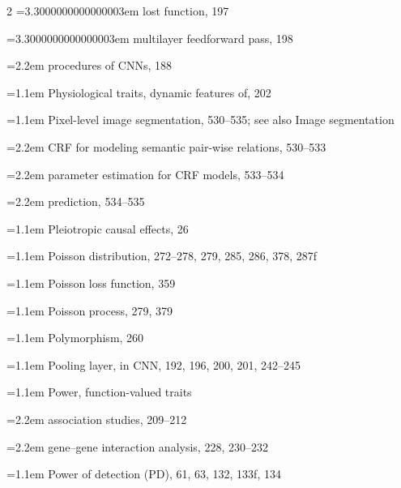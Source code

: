 \begin{multicols}{2}
\noindent\hangindent=3.3000000000000003em \hspace*{2.2em}lost function, 197\par
\noindent\hangindent=3.3000000000000003em \hspace*{2.2em}multilayer feedforward pass, 198\par
\noindent\hangindent=2.2em \hspace*{1.1em}procedures of CNNs, 188\par
\noindent\hangindent=1.1em Physiological traits, dynamic features of, 202\par
\noindent\hangindent=1.1em Pixel-level image segmentation, 530--535; see also Image segmentation\par
\noindent\hangindent=2.2em \hspace*{1.1em}CRF for modeling semantic pair-wise relations, 530--533\par
\noindent\hangindent=2.2em \hspace*{1.1em}parameter estimation for CRF models, 533--534\par
\noindent\hangindent=2.2em \hspace*{1.1em}prediction, 534--535\par
\noindent\hangindent=1.1em Pleiotropic causal effects, 26\par
\noindent\hangindent=1.1em Poisson distribution, 272--278, 279, 285, 286, 378, 287f\par
\noindent\hangindent=1.1em Poisson loss function, 359\par
\noindent\hangindent=1.1em Poisson process, 279, 379\par
\noindent\hangindent=1.1em Polymorphism, 260\par
\noindent\hangindent=1.1em Pooling layer, in CNN, 192, 196, 200, 201, 242--245\par
\noindent\hangindent=1.1em Power, function-valued traits\par
\noindent\hangindent=2.2em \hspace*{1.1em}association studies, 209--212\par
\noindent\hangindent=2.2em \hspace*{1.1em}gene--gene interaction analysis, 228, 230--232\par
\noindent\hangindent=1.1em Power of detection (PD), 61, 63, 132, 133f, 134\par

\end{multicols}
